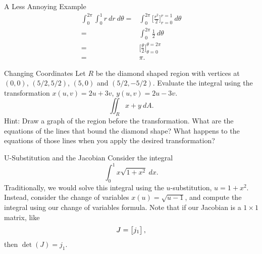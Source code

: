 \begin{example}{A Less Annoying Example}
\begin{align*}
\int_{0}^{2\pi}\int_{0}^1 r \ dr \ d\theta=& \int_{0}^{2\pi}\Bigg[\frac{r^2}{2} \Bigg]_{r=0}^{r=1} \ d\theta\\
=&\int_0^{2\pi}\frac{1}{2} \ d\theta \\
=&\Bigg[\frac{\theta}{2} \Bigg]_{\theta=0}^{\theta=2\pi} \\
=&\pi.
\end{align*}

\end{example}

\begin{exercise}{Changing Coordinates}
Let $R$ be the diamond shaped region with vertices at $(0,0)$, $(5/2,5/2)$, $(5,0)$ and $(5/2,-5/2)$. Evaluate the integral using the transformation $x(u,v)=2u+3v$, $y(u,v)=2u-3v$. $$\iint_R x+y \ dA .$$ 
Hint: Draw a graph of the region before the transformation. What are the equations of the lines that bound the diamond shape? What happens to the equations of those lines when you apply the desired transformation?
\end{exercise}

\begin{exercise}{U-Substitution and the Jacobian}
Consider the integral $$\int_{0}^1 x\sqrt{1+x^2} \ dx.$$
Traditionally, we would solve this integral using the $u$-substitution, $u=1+x^2$. Instead, consider the change of variables $x(u)=\sqrt{u-1}$, and compute the integral using our change of variables formula. Note that if our Jacobian is a $1\times 1$ matrix, like $$J=\begin{bmatrix}j_1\end{bmatrix}, $$ then $\det(J)=j_1$.
\end{exercise}